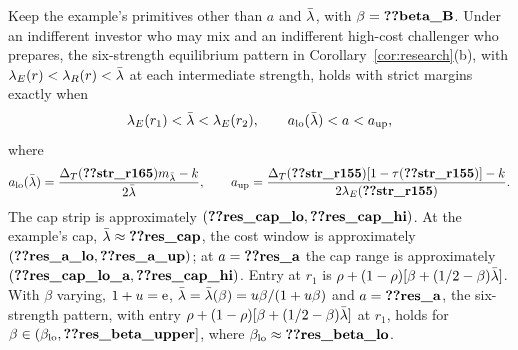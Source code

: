 \renewcommand{\theproposition}{A.\arabic{proposition}}
\renewcommand{\theHproposition}{A.\arabic{proposition}}
\setcounter{proposition}{0}
\begin{proposition}\label{prop:researchregion}
Keep the example's primitives other than \(a\) and \(\bar\lambda\), with \(\beta=\reg{beta_B}\).
Under an indifferent investor who may mix and an indifferent high-cost challenger who prepares, the six-strength
equilibrium pattern in Corollary~\ref{cor:research}(b), with
\(\lambda_E(r)<\lambda_R(r)<\bar\lambda\) at each intermediate strength, holds with strict margins exactly when
\[
 \lambda_E(r_1)<\bar\lambda<\lambda_E(r_2),\qquad a_{\rm lo}(\bar\lambda)<a<a_{\rm up},
\]
where
\[
 a_{\rm lo}(\lb)=\frac{\DT(\reg{str_r165})m_{\lb}-k}{2\lb},\qquad
 a_{\rm up}=\frac{\DT(\reg{str_r155})[1-\tau(\reg{str_r155})]-k}{2\lambda_E(\reg{str_r155})}.
\]
The cap strip is approximately \((\reg{res_cap_lo},\reg{res_cap_hi})\). At the example's cap,
\(\lb\approx\reg{res_cap}\), the cost window
is approximately \((\reg{res_a_lo},\reg{res_a_up})\); at \(a=\reg{res_a}\) the cap range is approximately
\((\reg{res_cap_lo_a},\reg{res_cap_hi})\). Entry at \(r_1\) is
\(\rho+(1-\rho)[\beta+(1/2-\beta)\bar\lambda]\).
With \(\beta\) varying, \(1+u=\mathrm{e}\), \(\bar\lambda=\bar\lambda(\beta)=u\beta/(1+u\beta)\) and \(a=\reg{res_a}\), the
six-strength pattern, with entry \(\rho+(1-\rho)[\beta+(1/2-\beta)\bar\lambda]\) at \(r_1\), holds for
\(\beta\in(\beta_{\rm lo},\reg{res_beta_upper}]\), where \(\beta_{\rm lo}\approx\reg{res_beta_lo}\).
\end{proposition}


